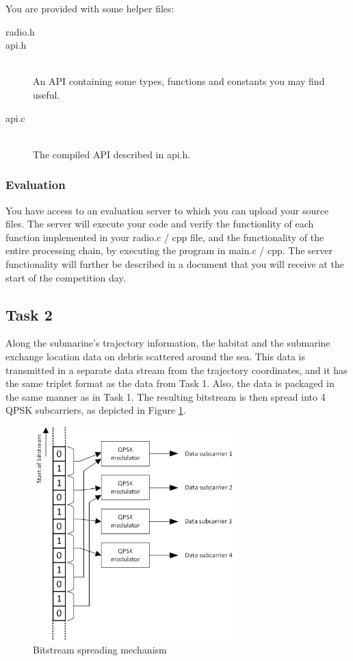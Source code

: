 \documentclass{article}
\begin{document}
You are provided with some helper files:
\begin{description}
	\item[radio.h]
	\item[api.h]
	\,\\ An API containing some types, functions and constants you may find useful.
	\item[api.c]
	\,\\ The compiled API described in \textsf{api.h}.
\end{description}


\subsubsection{Evaluation}

You have access to an evaluation server to which you can upload your source files.
The server will execute your code and verify the functionlity of each function implemented in your \textsf{radio.c / cpp} file,
and the functionality of the entire processing chain, by executing the program in \textsf{main.c / cpp}.
The server functionality will further be described in a document that you will receive at the start of the competition day.

\subsection{Task 2}

Along the submarine's trajectory information, the habitat and the submarine exchange location data on debris scattered around the sea. This data is transmitted in a separate data stream from the trajectory coordinates, and it has the same triplet format as the data from Task 1. Also, the data is packaged in the same manner as in Task 1. The resulting bitstream is then spread into 4 QPSK subcarriers, as depicted in Figure \ref{fig:spread}.
\begin{figure}[h!]
	\centering
	\includegraphics[width=0.7\textwidth]{Images/spread.png}
	\caption{Bitstream spreading mechanism}
	\label{fig:spread}
\end{figure}
\end{document}
